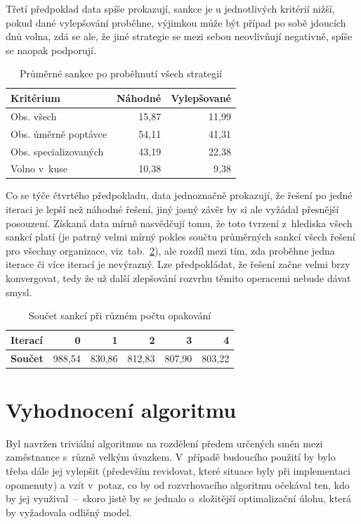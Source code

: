 \documentclass[twoside]{ctuthesis}
\begin{document}
Třetí předpoklad data spíše prokazují, sankce je u jednotlivých kritérií nižší, pokud dané vylepšování proběhne, výjimkou může být případ po sobě jdoucích dnů volna, zdá se ale, že jiné strategie se mezi sebou neovlivňují negativně, spíše se naopak podporují.

\begin{table}[h]
	\caption{Průměrné sankce po proběhnutí všech strategií}
	\label{tab:iterations}
	\begin{tabular}{lrr}
		\hline
		\textbf{Kritérium} & \textbf{Náhodné} & \textbf{Vylepšované}\\
		\hline
		\rowcolor{Gray}
		Obs. všech & 15,87 & 11,99\\
		Obs. úměrně poptávce & 54,11 & 41,31 \\
		\rowcolor{Gray}
		Obs. specializovaných & 43,19 & 22,38\\
		Volno v~kuse & 10,38 & 9,38\\
		\hline
	\end{tabular}
\end{table}

Co se týče čtvrtého předpokladu, data jednoznačně prokazují, že řešení po jedné iteraci je lepší než náhodné řešení, jiný jasný závěr by si ale vyžádal přesnější posouzení. Získaná data mírně nasvědčují tomu, že toto tvrzení z~hlediska všech sankcí platí (je patrný velmi mírný pokles součtu průměrných sankcí všech řešení pro všechny organizace, viz~tab.~\ref{tab:iterations}), ale rozdíl mezi tím, zda proběhne jedna iterace či více iterací je nevýrazný. Lze předpokládat, že řešení začne velmi brzy konvergovat, tedy že už další zlepšování rozvrhu těmito operacemi nebude dávat smysl.

\begin{table}[h]
	\caption{Součet sankcí při různém počtu opakování}
	\label{tab:iterations}
	\begin{tabular}{lrrrrr}
		\hline
		\textbf{Iterací} & 0 & 1 & 2 & 3 & 4\\
		\hline
		\rowcolor{Gray}
		\textbf{Součet} & 988,54 & 830,86 & 812,83  & 807,90 & 803,22\\
		\hline
	\end{tabular}
\end{table}

\section{Vyhodnocení algoritmu}

Byl navržen triviální algoritmus na rozdělení předem určených směn mezi zaměstnance s~různě velkým úvazkem. V~případě budoucího použití by bylo třeba dále jej vylepšit (především revidovat, které situace byly při implementaci opomenuty) a vzít v~potaz, co by od rozvrhovacího algoritmu očekával ten, kdo by jej využival~–~skoro jistě by se jednalo o~složitější optimalizační úlohu, která by vyžadovala odlišný model.
\end{document}
